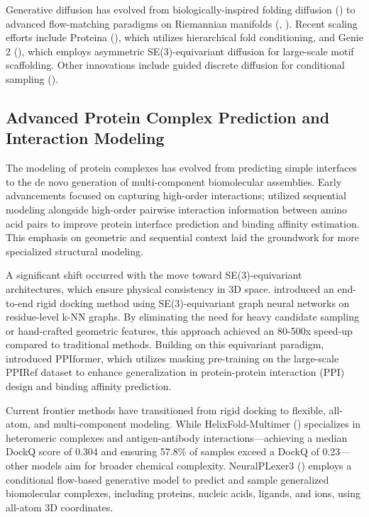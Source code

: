 \documentclass[11pt]{article}
\begin{document}
Generative diffusion has evolved from biologically-inspired folding diffusion (\citep{2209.15611}) to advanced flow-matching paradigms on Riemannian manifolds (\citep{2310.02391}, \citep{2310.05297}). Recent scaling efforts include Proteina (\citep{2503.00710}), which utilizes hierarchical fold conditioning, and Genie 2 (\citep{2405.15489}), which employs asymmetric SE(3)-equivariant diffusion for large-scale motif scaffolding. Other innovations include guided discrete diffusion for conditional sampling (\citep{2305.20009}).
\subsection{Advanced Protein Complex Prediction and Interaction Modeling}

The modeling of protein complexes has evolved from predicting simple interfaces to the de novo generation of multi-component biomolecular assemblies. Early advancements focused on capturing high-order interactions; \citep{2007.09334} utilized sequential modeling alongside high-order pairwise interaction information between amino acid pairs to improve protein interface prediction and binding affinity estimation. This emphasis on geometric and sequential context laid the groundwork for more specialized structural modeling.

A significant shift occurred with the move toward SE(3)-equivariant architectures, which ensure physical consistency in 3D space. \citep{2111.07786} introduced an end-to-end rigid docking method using SE(3)-equivariant graph neural networks on residue-level k-NN graphs. By eliminating the need for heavy candidate sampling or hand-crafted geometric features, this approach achieved an 80-500x speed-up compared to traditional methods. Building on this equivariant paradigm, \citep{2310.18515} introduced PPIformer, which utilizes masking pre-training on the large-scale PPIRef dataset to enhance generalization in protein-protein interaction (PPI) design and binding affinity prediction.

Current frontier methods have transitioned from rigid docking to flexible, all-atom, and multi-component modeling. While HelixFold-Multimer (\citep{2404.10260}) specializes in heteromeric complexes and antigen-antibody interactions—achieving a median DockQ score of 0.304 and ensuring 57.8\% of samples exceed a DockQ of 0.23—other models aim for broader chemical complexity. NeuralPLexer3 (\citep{2412.10743}) employs a conditional flow-based generative model to predict and sample generalized biomolecular complexes, including proteins, nucleic acids, ligands, and ions, using all-atom 3D coordinates.
\end{document}
